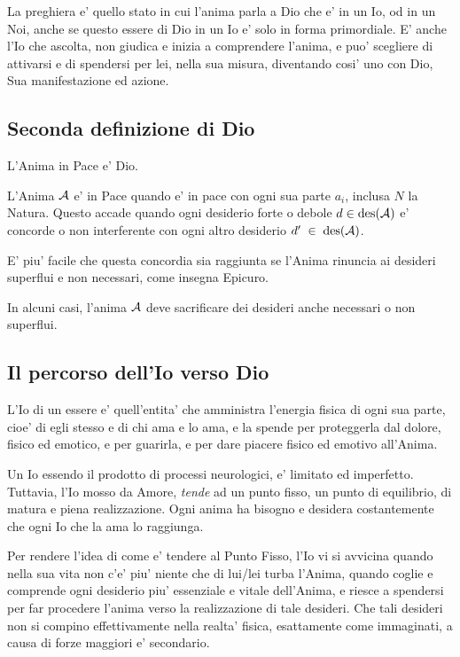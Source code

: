 La preghiera e' quello stato in cui l'anima parla a Dio che e' in un Io, od in un Noi, anche se questo essere di Dio in un Io e' solo in forma primordiale. E' anche l'Io che ascolta, non giudica e inizia a comprendere l'anima, e puo' scegliere di attivarsi e di spendersi per lei, nella sua misura, diventando cosi' uno con Dio, Sua manifestazione ed azione.


\subsection{Seconda definizione di Dio}

L'Anima in Pace e' Dio. 

L'Anima $\mathcal{A}$ e' in Pace quando e' in pace con ogni sua parte $a_i$, inclusa $N$ la Natura. Questo accade quando ogni desiderio forte o debole $d\in\textrm{des}(\mathcal{A})$ e' concorde o non interferente con ogni altro desiderio $d'\;\in\;\textrm{des}(\mathcal{A})$.

E' piu' facile che questa concordia sia raggiunta se l'Anima rinuncia ai desideri superflui e non necessari, come insegna Epicuro.

In alcuni casi, l'anima $\mathcal{A}$ deve sacrificare dei desideri anche necessari o non superflui.


\subsection{Il percorso dell'Io verso Dio}
\label{definizioneAnimo}

L'Io di un essere e' quell'entita' che amministra l'energia fisica di ogni sua parte, cioe' di egli stesso e di chi ama e lo ama, e la spende per proteggerla dal dolore, fisico ed emotico, e per guarirla, e per dare piacere fisico ed emotivo all'Anima.


Un Io essendo il prodotto di processi neurologici, e' limitato ed imperfetto. Tuttavia, l'Io mosso da Amore, \emph{tende} ad un punto fisso, un punto di equilibrio, di matura e piena realizzazione. Ogni anima ha bisogno e desidera costantemente che ogni Io che la ama lo raggiunga. 

Per rendere l'idea di come e' tendere al Punto Fisso, l'Io vi si avvicina quando nella sua vita non c'e' piu' niente che di lui/lei turba l'Anima, quando coglie e comprende ogni desiderio piu' essenziale e vitale dell'Anima, e riesce a spendersi per far procedere l'anima verso la realizzazione di tale desideri. Che tali desideri non si compino effettivamente nella realta' fisica, esattamente come immaginati, a causa di forze maggiori e' secondario.

